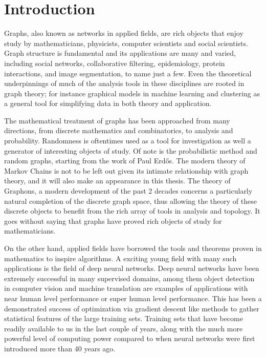\documentclass{ucbthesis}
\theoremstyle{definition}
\theoremstyle{remark}
\begin{document}
\pagestyle{headings}

\chapter{Introduction}

Graphs, also known as networks in applied fields, are rich objects that enjoy study by mathematicians, physicists, computer scientists and social scientists.  Graph structure is fundamental and its applications are many and varied, including social networks, collaborative filtering, epidemiology, protein interactions, and image segmentation, to name just a few.  Even the theoretical underpinnings of much of the analysis tools in these disciplines are rooted in graph theory; for instance  graphical models in machine learning and clustering as a general tool for simplifying data in both theory and application.  

The mathematical treatment of graphs has been approached from many directions, from discrete mathematics and combinatorics, to analysis and probability. Randomness is oftentimes used as a tool for investigation as well a generator of interesting objects of study.  Of note is the probabilistic method and random graphs, starting from the work of Paul Erd\H{o}s.  The modern theory of Markov Chains is not to be left out given its intimate relationship with graph theory, and it will also make an appearance in this thesis. The theory of Graphons, a modern development of the past 2 decades concerns a particularly natural completion of the discrete graph space, thus allowing the theory of these discrete objects to benefit from the rich array of tools in analysis and topology.  It goes without saying that graphs have proved rich objects of study for mathematicians.  

On the other hand, applied fields have borrowed the tools and theorems proven in mathematics to inspire algorithms. A exciting young field with many such applications is the field of deep neural networks.  Deep neural networks have been extremely successful in many supervised domains, among them object detection in computer vision and machine translation are examples of applications with near human level performance or super human level performance.  This has been a demonstrated success of optimization via gradient descent like methods to gather statistical features of the large training sets.  Training sets that have become readily available to us in the last couple of years, along with the much more powerful level of computing power compared to when neural networks were first introduced more than 40 years ago.  
\end{document}
